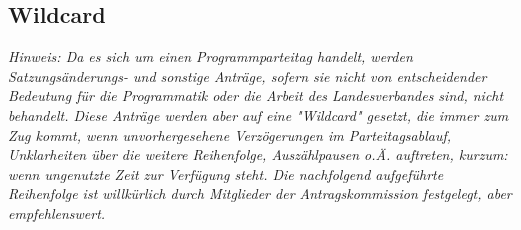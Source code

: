 \begin{multicols}{2}
\subsection{Wildcard}
\textit{Hinweis: Da es sich um einen Programmparteitag
handelt, werden Satzungsänderungs- und
sonstige Anträge, sofern sie nicht von
entscheidender Bedeutung für die
Programmatik oder die Arbeit des
Landesverbandes sind, nicht behandelt. Diese
Anträge werden aber auf eine "Wildcard"
gesetzt, die immer zum Zug kommt, wenn
unvorhergesehene Verzögerungen im
Parteitagsablauf, Unklarheiten über die
weitere Reihenfolge, Auszählpausen o.Ä.
auftreten, kurzum: wenn ungenutzte Zeit zur
Verfügung steht. Die nachfolgend aufgeführte
Reihenfolge ist willkürlich durch Mitglieder
der Antragskommission festgelegt, aber
empfehlenswert.
}
\begin{itemize}
\end{itemize}
\end{multicols}
